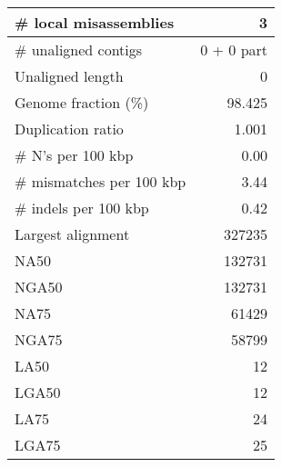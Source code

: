 \documentclass[12pt,a4paper]{article}
\begin{document}
\begin{table}[ht]
\begin{center}
\begin{tabular}{|l*{1}{|r}|}
\# local misassemblies & 3 \\ \hline
\# unaligned contigs & 0 + 0 part \\ \hline
Unaligned length & 0 \\ \hline
Genome fraction (\%) & 98.425 \\ \hline
Duplication ratio & 1.001 \\ \hline
\# N's per 100 kbp & 0.00 \\ \hline
\# mismatches per 100 kbp & 3.44 \\ \hline
\# indels per 100 kbp & 0.42 \\ \hline
Largest alignment & 327235 \\ \hline
NA50 & 132731 \\ \hline
NGA50 & 132731 \\ \hline
NA75 & 61429 \\ \hline
NGA75 & 58799 \\ \hline
LA50 & 12 \\ \hline
LGA50 & 12 \\ \hline
LA75 & 24 \\ \hline
LGA75 & 25 \\ \hline
\end{tabular}
\end{center}
\end{table}
\end{document}
